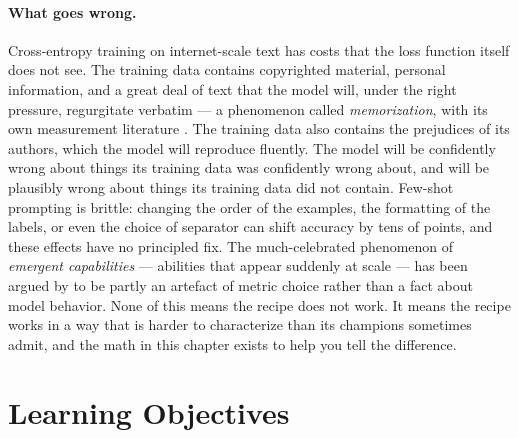 \paragraph{What goes wrong.}
Cross-entropy training on internet-scale text has costs that the
loss function itself does not see. The training data contains
copyrighted material, personal information, and a great deal of
text that the model will, under the right pressure, regurgitate
verbatim --- a phenomenon called \emph{memorization}, with its
own measurement literature \citep{carlini2021extracting,
carlini2023quantifying}. The training data also contains the
prejudices of its authors, which the model will reproduce
fluently. The model will be confidently wrong about things its
training data was confidently wrong about, and will be plausibly
wrong about things its training data did not contain. Few-shot
prompting is brittle: changing the order of the examples, the
formatting of the labels, or even the choice of separator can shift
accuracy by tens of points, and these effects have no principled
fix. The much-celebrated phenomenon of \emph{emergent capabilities}
--- abilities that appear suddenly at scale --- has been argued by
\citet{schaeffer2023mirage} to be partly an artefact of metric
choice rather than a fact about model behavior. None of this means
the recipe does not work. It means the recipe works in a way that
is harder to characterize than its champions sometimes admit, and
the math in this chapter exists to help you tell the difference.

\section{Learning Objectives}

